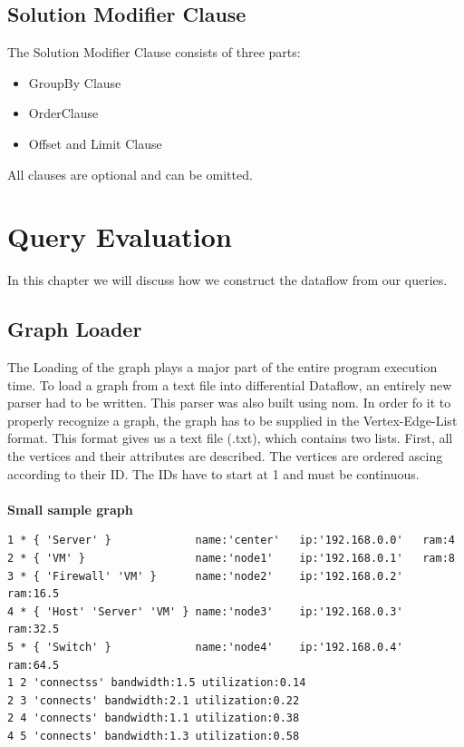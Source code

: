 \documentclass[11pt,singlecolumn]{scrartcl}
\begin{document}
 
 \clearpage
 
 \subsection{Solution Modifier Clause}
 
 The Solution Modifier Clause consists of three parts: 
  \begin{itemize} 
\item GroupBy Clause
\item OrderClause
\item Offset and Limit Clause
\end{itemize}
 All clauses are optional and can be omitted. 
 
\clearpage



\section{Query Evaluation}
In this chapter we will discuss how we construct the dataflow from our queries.
\subsection{Graph Loader}
The Loading of the graph plays a major part of the entire program execution time. To load a graph from a text file into differential Dataflow, an entirely new parser had to be written. This parser was also built using nom. In order fo it to properly recognize a graph, the graph has to be supplied in the Vertex-Edge-List format\cite{EdgeList}. This format gives us a text file (.txt), which contains two lists. First, all the vertices and their attributes are described. The vertices are ordered ascing according to their ID. The IDs have to start at 1 and must be continuous.\\\\
\textbf{Small sample graph}
\begin{lstlisting}
1 * { 'Server' }             name:'center'   ip:'192.168.0.0'   ram:4
2 * { 'VM' }                 name:'node1'    ip:'192.168.0.1'	ram:8
3 * { 'Firewall' 'VM' }      name:'node2'    ip:'192.168.0.2'	ram:16.5
4 * { 'Host' 'Server' 'VM' } name:'node3'    ip:'192.168.0.3'	ram:32.5
5 * { 'Switch' }             name:'node4'    ip:'192.168.0.4'	ram:64.5
1 2 'connectss' bandwidth:1.5 utilization:0.14
2 3 'connects' bandwidth:2.1 utilization:0.22
2 4 'connects' bandwidth:1.1 utilization:0.38
4 5 'connects' bandwidth:1.3 utilization:0.58
\end{lstlisting}
\clearpage
\end{document}

